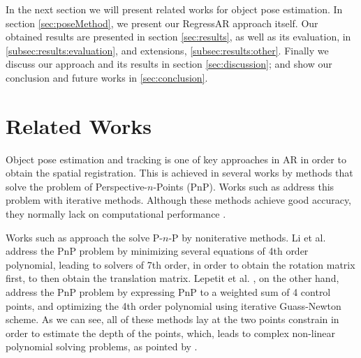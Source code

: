\documentclass[annual]{acmsiggraph}
\begin{document}
In the next section we will present related works for object pose estimation. In section \ref{sec:poseMethod}, we present our RegressAR approach itself. Our obtained results are presented in section \ref{sec:results}, as well as its evaluation, in \ref{subsec:results:evaluation}, and extensions, \ref{subsec:results:other}. Finally we discuss our approach and its results in section \ref{sec:discussion}; and show our conclusion and future works in \ref{sec:conclusion}.


\section{Related Works}
\label{sec:relatedWorks}

Object pose estimation and tracking is one of key approaches in AR in order to obtain the spatial registration. This is achieved in several works by methods that solve the problem of Perspective-$n$-Points (PnP). Works such as \cite{Lu:2000,Lowe:1991} address this problem with iterative methods. Although these methods achieve good accuracy, they normally lack on computational performance \cite{Lepetit:2009}. 

Works such as \cite{Lepetit:2009,Li:2012} approach the solve P-$n$-P by noniterative methods. Li et al. address the PnP problem by minimizing several equations of 4th order polynomial, leading to solvers of 7th order, in order to obtain the rotation matrix first, to then obtain the translation matrix. Lepetit et al. , on the other hand, address the PnP problem by expressing PnP to a weighted sum of 4 control points, and optimizing the 4th order polynomial using iterative Guass-Newton scheme. As we can see, all of these methods lay at the two points constrain in order to estimate the depth of the points, which, leads to complex non-linear polynomial solving problems, as pointed by \cite{Kukelova:2008}.     

\end{document}
